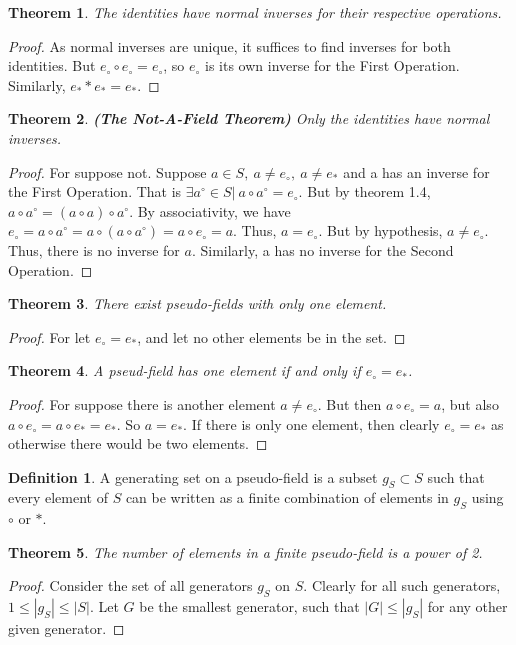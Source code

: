 \documentclass[oneside]{book}
\newtheorem{theorem}{Theorem}[section]
\theoremstyle{definition}
\newtheorem{definition}{Definition}[section]
\begin{document}
\begin{theorem} The identities have normal inverses for their respective operations.
\end{theorem}
\begin{proof} As normal inverses are unique, it suffices to find inverses for both identities. But $e_{\circ}\circ e_{\circ}=e_{\circ}$, so $e_{\circ}$ is its own inverse for the First Operation. Similarly, $e_{*}*e_{*}=e_{*}$.
\end{proof}
\begin{theorem} \textbf{(The Not-A-Field Theorem)} Only the identities have normal inverses.
\end{theorem}
\begin{proof} For suppose not. Suppose $a\in S,\ a\ne e_{\circ},\ a\ne e_{*}$ and a has an inverse for the First Operation. That is $\exists a^{\circ}\in S|\ a\circ a^{\circ}=e_{\circ}$. But by theorem 1.4, $a\circ a^{\circ}=(a\circ a)\circ a^{\circ}$. By associativity, we have $e_{\circ}=a\circ a^{\circ} = a\circ (a\circ a^{\circ})=a\circ e_{\circ}=a$. Thus, $a=e_{\circ}$. But by hypothesis, $a\ne e_{\circ}$. Thus, there is no inverse for $a$. Similarly, a has no inverse for the Second Operation.
\end{proof}
\begin{theorem}
There exist pseudo-fields with only one element.
\end{theorem}
\begin{proof}
For let $e_{\circ} = e_{*}$, and let no other elements be in the set. 
\end{proof}
\begin{theorem}
A pseud-field has one element if and only if $e_{\circ} = e_{*}$.
\end{theorem}
\begin{proof}
For suppose there is another element $a \ne e_{\circ}$. But then $a \circ e_{\circ} = a$, but also $a \circ e_{\circ} = a \circ e_{*} = e_{*}$. So $a = e_{*}$. If there is only one element, then clearly $e_{\circ} = e_{*}$ as otherwise there would be two elements.
\end{proof}
\begin{definition} A generating set on a pseudo-field is a subset $g_S \subset S$ such that every element of $S$ can be written as a finite combination of elements in $g_S$ using $\circ$ or $*$.
\end{definition}
\begin{theorem}
The number of elements in a finite pseudo-field is a power of 2.
\end{theorem}
\begin{proof}
Consider the set of all generators $g_S$ on $S$. Clearly for all such generators, $1\leq |g_S|\leq |S|$. Let $G$ be the smallest generator, such that $|G| \leq |g_S|$ for any other given generator. 
\end{proof}
\end{document}
